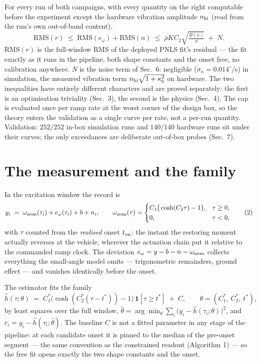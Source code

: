 \documentclass[10pt]{article}
\newcommand{\rbar}{\bar\rho}
\newcommand{\rms}{\mathrm{RMS}}
\begin{document}
For every run of both campaigns, with every quantity on the right
computable before the experiment except the hardware vibration
amplitude $n_{\rm hi}$ (read from the run's own out-of-band content),
\begin{equation}
  \boxed{\;
  \rms(r)
  \;\le\; \rms(e_\omega) + \rms(n)
  \;\le\; \rbar K C_2\sqrt{\tfrac{B(x)}{x}} \;+\; N .
  \;}
  \tag{1}
\end{equation}
$\rms(r)$ is the full-window RMS of the deployed PNLS fit's residual
--- the fit exactly as it runs in the pipeline, both shape constants
and the onset free, no calibration anywhere. $N$ is the noise term of
Sec.~6: negligible ($\sigma_n = 0.014^\circ$/s) in simulation, the
measured vibration term $n_{\rm hi}\sqrt{1+\kappa_b^2}$ on hardware.
The two inequalities have entirely different characters and are
proved separately: the first is an optimisation triviality (Sec.~3),
the second is the physics (Sec.~4). The cap is evaluated once per
ramp rate at the worst corner of the design box, so the theory
enters the validation as a single curve per rate, not a per-run
quantity. Validation: $252/252$ in-box simulation runs and
$140/140$ hardware runs sit under their curves; the only
exceedances are deliberate out-of-box probes (Sec.~7).

\section{The measurement and the family}

In the excitation window the record is
\begin{equation}
  y_i \;=\; \omega_{\rm nom}(\tau_i) + e_\omega(\tau_i) + b + n_i,
  \qquad
  \omega_{\rm nom}(\tau) =
  \begin{cases}
    C_1\big(\cosh(C_2\tau) - 1\big), & \tau \ge 0,\\[1pt]
    0, & \tau < 0,
  \end{cases}
  \tag{2}
\end{equation}
with $\tau$ counted from the \emph{realised} onset $t_{\rm on}$: the
instant the restoring moment actually reverses at the vehicle,
wherever the actuation chain put it relative to the commanded ramp
clock. The deviation $e_\omega = y - b - n - \omega_{\rm nom}$
collects everything the small-angle model omits --- trigonometric
remainders, ground effect --- and vanishes identically before the
onset.

The estimator fits the family
\begin{equation}
  \hat h(\tau;\theta)
  \;=\; C_1^*\big(\cosh(C_2^*(\tau - t^*)) - 1\big)\,
        \mathbf 1[\tau \ge t^*] \;+\; C,
  \qquad
  \theta = (C_1^*,\ C_2^*,\ t^*),
  \tag{3}
\end{equation}
by least squares over the full window,
$\hat\theta = \arg\min_\theta \sum_i \big(y_i -
\hat h(\tau_i;\theta)\big)^2$, and
$r_i = y_i - \hat h(\tau_i;\hat\theta)$. The baseline $C$ is not a
fitted parameter in any stage of the pipeline: at each candidate
onset it is pinned to the median of the pre-onset segment --- the
same convention as the constrained readout (Algorithm 1) --- so the
free fit opens exactly the two shape constants and the onset.
\end{document}
